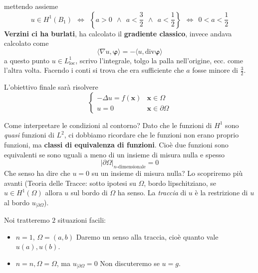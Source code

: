 \documentclass[10pt,a4paper,twoside,openright]{book}
\newcommand{\x}{\mathbf{x}}
\begin{document}
mettendo assieme
\begin{equation*}
	u\in H^{1}( B_{1}) \ \ \Leftrightarrow \ \ \left\{a >0\ \ \land \ \ a< \frac{3}{2} \ \ \land \ \ a< \frac{1}{2}\right\} \ \ \Leftrightarrow \ \ 0< a< \frac{1}{2}
\end{equation*}
\textbf{Verzini ci ha burlati}, ha calcolato il \textbf{gradiente classico}, invece andava calcolato come
\begin{equation*}
	\langle \nabla u,\mathbf{\varphi } \rangle =-\langle u,\mathrm{div}\mathbf{\varphi } \rangle 
\end{equation*}
a questo punto $u\in L^{1}_{\mathrm{loc}}$, scrivo l'integrale, tolgo la palla nell'origine, ecc. come l'altra volta. Facendo i conti si trova che era sufficiente che $a$ fosse minore di $\frac{3}{2}$.



L'obiettivo finale sarà risolvere
\begin{equation*}
	\begin{cases}
		-\Delta u=f(\x) & \x \in \Omega          \\
		u=0                     & \x \in \partial \Omega 
	\end{cases}
\end{equation*}
\begin{oss}
	Come interpretare le condizioni al contorno? Dato che le funzioni di $H^{1}$ sono \textit{quasi} funzioni di $L^{2}$, ci dobbiamo ricordare che le funzioni non erano proprio funzioni, ma \textbf{classi di equivalenza di funzioni}. Cioè due funzioni sono equivalenti se sono uguali a meno di un insieme di misura nulla e spesso
	\begin{equation*}
		| \partial \Omega | _{n\text{-dimensionale}} =0
	\end{equation*}
	Che senso ha dire che $u=0$ su un insieme di misura nulla? Lo scopriremo più avanti (Teoria delle Tracce: sotto ipotesi su $\Omega $, bordo lipschitziano, se $u\in H^{1}( \Omega )$ allora $u$ sul bordo di $\Omega $ ha senso. La \textit{traccia} di $u$ è la restrizione di $u$ al bordo $u_{|\partial \Omega }$).
\end{oss}
Noi tratteremo $2$ situazioni facili:
\begin{itemize}
	\item $n=1$, $\Omega =( a,b)$
	      Daremo un senso alla traccia, cioè quanto vale $u( a) ,u( b)$.
	\item $n=n,\Omega =\Omega $, ma $u_{|\partial \Omega } =0$
	      Non discuteremo se $u=g$.
\end{itemize}
\end{document}
